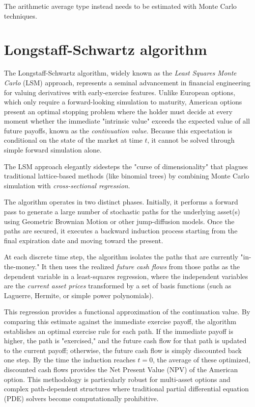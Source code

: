 The arithmetic average type instead needs to be estimated with Monte Carlo techniques.


\section{Longstaff-Schwartz algorithm}
The Longstaff-Schwartz algorithm, widely known as the \emph{Least Squares Monte Carlo} (LSM) approach, represents a seminal advancement in financial engineering for valuing derivatives with early-exercise features.
Unlike European options, which only require a forward-looking simulation to maturity, American options present an optimal stopping problem where the holder must decide at every moment whether the immediate 
"intrinsic value" exceeds the expected value of all future payoffs, known as the \emph{continuation value}. Because this expectation is conditional on the state of the market at time $t$, it cannot be solved through simple forward simulation alone.

The LSM approach elegantly sidesteps the "curse of dimensionality" that plagues traditional lattice-based methods (like binomial trees) by combining Monte Carlo simulation with \emph{cross-sectional regression}. 

The algorithm operates in two distinct phases. Initially, it performs a forward pass to generate a large number of stochastic paths for the underlying asset(s) using Geometric Brownian Motion or other jump-diffusion models. Once the paths are secured, it executes a backward induction process starting from the final expiration date and moving toward the present.

At each discrete time step, the algorithm isolates the paths that are currently "in-the-money." It then uses the realized \emph{future cash flows} from those paths as the dependent variable in a least-squares regression, where the independent variables are the \emph{current asset prices} transformed by a set of basis functions (such as Laguerre, Hermite, or simple power polynomials).

This regression provides a functional approximation of the continuation value. By comparing this estimate against the immediate exercise payoff, the algorithm establishes an optimal exercise rule for each path. 
If the immediate payoff is higher, the path is "exercised," and the future cash flow for that path is updated to the current payoff; otherwise, the future cash flow is simply discounted back one step. 
By the time the induction reaches $t=0$, the average of these optimized, discounted cash flows provides the Net Present Value (NPV) of the American option. This methodology is particularly robust for multi-asset options and complex path-dependent structures where traditional partial differential equation (PDE) solvers become computationally prohibitive.

